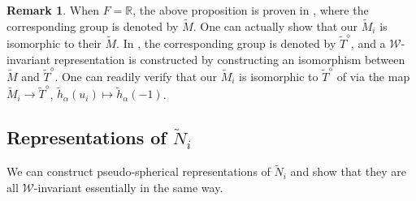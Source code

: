 \documentclass[10pt, letterpaper]{amsart}
\theoremstyle{plain}
\theoremstyle{definition}
\newtheorem*{Rmk}{Remark}
\numberwithin{equation}{section}
\newcommand{\R}{\mathbb{R}}
\newcommand{\hta}{\tilde{h}_{\alpha}}
\newcommand{\Mt}{\widetilde{M}}
\newcommand{\Nt}{\widetilde{N}}
\newcommand{\Tt}{\widetilde{T}}
\newcommand{\Wcal}{\mathcal{W}}
\begin{document}
\begin{Rmk}
When $F=\R$, the above proposition is proven in \cite{ABPTV}, where the corresponding group is denoted by $\Mt$. One can actually show that our $\Mt_i$ is isomorphic to their $\Mt$. In \cite{Karasiewicz}, the corresponding group is denoted by $\Tt^{\diamond}$, and a $\Wcal$-invariant representation is constructed by constructing an isomorphism between $\Mt$ and $\Tt^{\diamond}$. One can readily verify that our $\Mt_i$ is isomorphic to $\Tt^{\diamond}$ of \cite{Karasiewicz} via the map $\Mt_i\to\Tt^{\diamond}$, $\hta(u_i)\mapsto\hta(-1)$.
\end{Rmk}



\subsection{Representations of $\Nt_i$}


We can construct pseudo-spherical representations of $\Nt_i$ and show that they are all $\Wcal$-invariant essentially in the same way.
\end{document}
